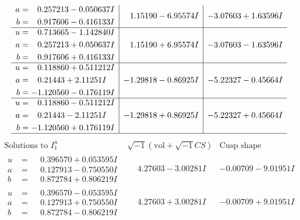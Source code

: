 \documentclass[1p]{elsarticle_modified}
\theoremstyle{definition}
\newcommand{\I}{\sqrt{-1}}
\begin{document}
$$\begin{array}{c|c|c}
\begin{aligned}
a &= \phantom{-}0.257213 - 0.050637 I \\
b &= \phantom{-}0.917606 - 0.416133 I\end{aligned}
 & \phantom{-}1.15190 - 6.95574 I & -3.07603 + 1.63596 I \\ \hline\begin{aligned}
u &= \phantom{-}0.713665 - 1.142840 I \\
a &= \phantom{-}0.257213 + 0.050637 I \\
b &= \phantom{-}0.917606 + 0.416133 I\end{aligned}
 & \phantom{-}1.15190 + 6.95574 I & -3.07603 - 1.63596 I \\ \hline\begin{aligned}
u &= \phantom{-}0.118860 + 0.511212 I \\
a &= \phantom{-}0.21443 + 2.11251 I \\
b &= -1.120560 - 0.176119 I\end{aligned}
 & -1.29818 - 0.86925 I & -5.22327 - 0.45664 I \\ \hline\begin{aligned}
u &= \phantom{-}0.118860 - 0.511212 I \\
a &= \phantom{-}0.21443 - 2.11251 I \\
b &= -1.120560 + 0.176119 I\end{aligned}
 & -1.29818 + 0.86925 I & -5.22327 + 0.45664 I\\
 \hline 
 \end{array}$$\newpage$$\begin{array}{c|c|c}  
\text{Solutions to }I^u_{1}& \I (\text{vol} + \sqrt{-1}CS) & \text{Cusp shape}\\
 \hline 
\begin{aligned}
u &= \phantom{-}0.396570 + 0.053595 I \\
a &= \phantom{-}0.127913 - 0.750550 I \\
b &= \phantom{-}0.872784 + 0.806219 I\end{aligned}
 & \phantom{-}4.27603 - 3.00281 I & -0.00709 - 9.01951 I \\ \hline\begin{aligned}
u &= \phantom{-}0.396570 - 0.053595 I \\
a &= \phantom{-}0.127913 + 0.750550 I \\
b &= \phantom{-}0.872784 - 0.806219 I\end{aligned}
 & \phantom{-}4.27603 + 3.00281 I & -0.00709 + 9.01951 I \\ \hline\begin{aligned}

\end{aligned}
\end{array}$$
\end{document}
